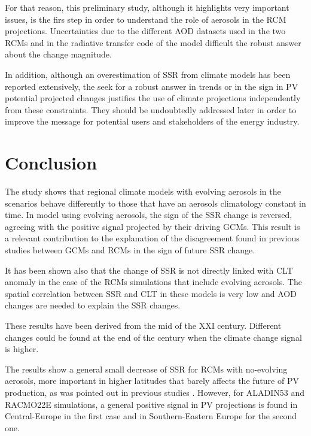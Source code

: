 For that reason, this preliminary study, although it highlights very important issues, is the firs step in order to understand the role of aerosols in the RCM projections. Uncertainties due to the different AOD datasets used in the two RCMs and in the radiative transfer code of the model difficult the robust answer about the change magnitude. 

In addition, although an overestimation of SSR from climate models has been reported extensively, the seek for a robust answer in trends or in the sign in PV potential projected changes justifies the use of climate projections independently from these constraints. They should be undoubtedly addressed later in order to improve the message for potential users and stakeholders of the energy industry.

\section{Conclusion}

The study shows that regional climate models with evolving aerosols in the scenarios behave differently to those that have an aerosols climatology constant in time. In model using evolving aerosols, the sign of the SSR change is reversed, agreeing with the positive signal projected by their driving GCMs. This result is a relevant contribution to the explanation of the disagreement found in previous studies between GCMs and RCMs in the sign of future SSR change.

It has been shown also that the change of SSR is not directly linked with CLT anomaly in the case of the RCMs simulations that include evolving aerosols. The spatial correlation between SSR and CLT in these models is very low and AOD changes are needed to explain the SSR changes.

These results have been derived from the mid of the XXI century. Different changes could be found at the end of the century when the climate change signal is higher.

The results show a general small decrease of SSR for RCMs with no-evolving aerosols, more important in higher latitudes that barely affects the future of PV production, as was pointed out in previous studies \cite*{Jerez2015, Jerez2019}. However, for ALADIN53 and RACMO22E simulations, a general positive signal in PV projections is found in Central-Europe in the first case and in Southern-Eastern Europe for the second one.

